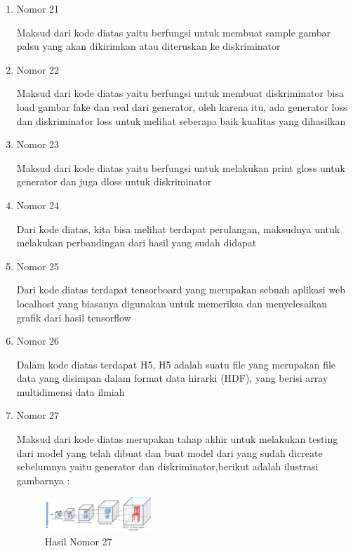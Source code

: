 \begin{enumerate}
\item Nomor 21\\
\hfill\break
	
Maksud dari kode diatas yaitu berfungsi untuk membuat sample gambar palsu yang akan dikirimkan atau diteruskan ke diskriminator

\item Nomor 22\\
\hfill\break
	
Maksud dari kode diatas yaitu berfungsi untuk membuat diskriminator bisa load gambar fake dan real dari generator, oleh karena itu, ada generator loss dan diskriminator loss untuk melihat seberapa baik kualitas yang dihasilkan

\item Nomor 23\\
\hfill\break
	
Maksud dari kode diatas yaitu berfungsi untuk melakukan print gloss untuk generator dan juga dloss untuk diskriminator

\item Nomor 24\\
\hfill\break
	
Dari kode diatas, kita bisa melihat terdapat perulangan, maksudnya untuk melakukan perbandingan dari hasil yang sudah didapat

\item Nomor 25\\
\hfill\break
	
Dari kode diatas terdapat tensorboard yang merupakan sebuah aplikasi web localhost yang biasanya digunakan untuk memeriksa dan menyelesaikan grafik dari hasil tensorflow

\item Nomor 26\\
\hfill\break
	
Dalam kode diatas terdapat H5, H5 adalah suatu file yang merupakan file data yang disimpan dalam format data hirarki (HDF), yang berisi array multidimensi data ilmiah

\item Nomor 27\\
\hfill\break
	
Maksud dari kode diatas merupakan tahap akhir untuk melakukan testing dari model yang telah dibuat dan buat model dari yang sudah dicreate sebelumnya yaitu generator dan diskriminator,berikut adalah ilustrasi gambarnya :
\begin{figure}[H]
	\includegraphics[width=4cm]{figures/1174054/8/10.png}
	\centering
	\caption{Hasil Nomor 27}
\end{figure}

\end{enumerate}

